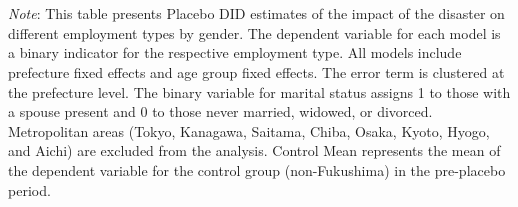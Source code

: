 \documentclass[serif, aspectratio=169]{beamer}
\begin{document}
\begin{frame}[label=different_types_placebo]
\begin{table}[htbp]
\\\\{\linewidth}{\tiny \textit{Note}: This table presents Placebo DID estimates of the impact of the disaster on different employment types by gender. The dependent variable for each model is a binary indicator for the respective employment type. All models include prefecture fixed effects and age group fixed effects. The error term is clustered at the prefecture level. The binary variable for marital status assigns 1 to those with a spouse present and 0 to those never married, widowed, or divorced. Metropolitan areas (Tokyo, Kanagawa, Saitama, Chiba, Osaka, Kyoto, Hyogo, and Aichi) are excluded from the analysis. Control Mean represents the mean of the dependent variable for the control group (non-Fukushima) in the pre-placebo period.}
\end{table}

\end{frame}

\end{document}
